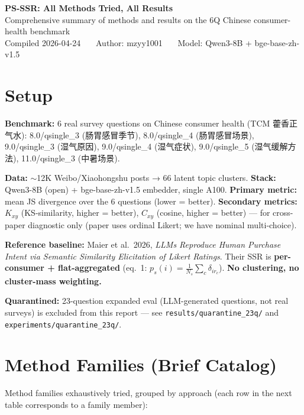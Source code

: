 \documentclass[10pt,a4paper]{article}
\begin{document}
\begin{center}
{\LARGE \textbf{PS-SSR: All Methods Tried, All Results}}\\[2pt]
{\small Comprehensive summary of methods and results on the 6Q Chinese consumer-health benchmark}\\[2pt]
{\small Compiled 2026-04-24 \ \textbar\ \ Author: mzyy1001 \ \textbar\ \ Model: Qwen3-8B + bge-base-zh-v1.5}
\end{center}

\section{Setup}

\textbf{Benchmark:} 6 real survey questions on Chinese consumer health (TCM 藿香正气水):
8.0/qsingle\_3 (肠胃感冒季节), 8.0/qsingle\_4 (肠胃感冒场景), 9.0/qsingle\_3 (湿气原因), 9.0/qsingle\_4 (湿气症状), 9.0/qsingle\_5 (湿气缓解方法), 11.0/qsingle\_3 (中暑场景).

\textbf{Data:} $\sim$12K Weibo/Xiaohongshu posts → 66 latent topic clusters.
\textbf{Stack:} Qwen3-8B (open) + bge-base-zh-v1.5 embedder, single A100.
\textbf{Primary metric:} mean JS divergence over the 6 questions (lower = better).
\textbf{Secondary metrics:} $K_{xy}$ (KS-similarity, higher = better), $C_{xy}$ (cosine, higher = better) — for cross-paper diagnostic only (paper uses ordinal Likert; we have nominal multi-choice).

\textbf{Reference baseline:} Maier et al.\ 2026, \emph{LLMs Reproduce Human Purchase Intent via Semantic Similarity Elicitation of Likert Ratings}. Their SSR is \textbf{per-consumer + flat-aggregated} (eq.~1: $p_s(i)=\frac{1}{N_s}\sum_c \delta_{i r_c}$). \textbf{No clustering, no cluster-mass weighting.}

\textbf{Quarantined:} 23-question expanded eval (LLM-generated questions, not real surveys) is excluded from this report — see \texttt{results/quarantine\_23q/} and \texttt{experiments/quarantine\_23q/}.

\section{Method Families (Brief Catalog)}

Method families exhaustively tried, grouped by approach (each row in the next table corresponds to a family member):
\end{document}
